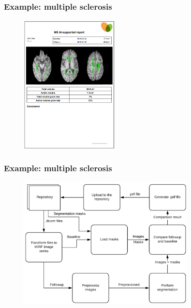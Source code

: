 \documentclass[xetex,mathserif,serif]{beamer}
\begin{document}
 
  \begin{frame}
     \frametitle{Example: multiple sclerosis}
        \begin{figure}
             \includegraphics[width=5cm]{pictures/mirfms.png}
         \end{figure}
 \end{frame}

  \begin{frame}
     \frametitle{Example: multiple sclerosis}
        \begin{figure}
             \includegraphics[width=0.8\textwidth]{pictures/mirfMsPipeline.png}
         \end{figure}
 \end{frame}
\end{document}
